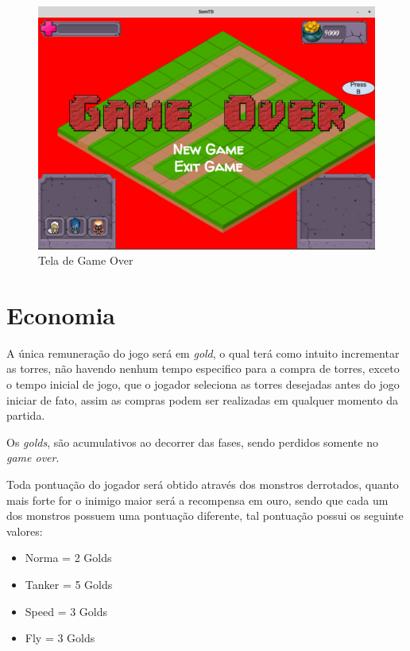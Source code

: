 \documentclass[11pt]{article} %
\begin{document}
\begin{figure}[!htp]
\centering
\includegraphics[scale=0.3]{res/game_over.png}
\caption{Tela de Game Over}
\label{Game Over}
\end{figure}
\newpage

\section{Economia}

A única remuneração do jogo será em \textit{gold}, o qual terá como intuito incrementar as torres, não havendo nenhum tempo especifico para a compra de torres, exceto o tempo inicial de jogo, que o jogador seleciona as torres desejadas antes do jogo iniciar de fato, assim as compras podem ser realizadas em qualquer momento da partida.

Os \textit{golds}, são acumulativos ao decorrer das fases, sendo perdidos somente no \textit{game over}.

Toda pontuação do jogador será obtido através dos monstros derrotados, quanto mais forte for o inimigo  maior será a recompensa em ouro, sendo que cada um dos monstros possuem uma pontuação diferente, tal pontuação possui os seguinte valores:

\begin{itemize}
 \item Norma = 2 Golds
 \item Tanker = 5 Golds
 \item Speed = 3 Golds
 \item Fly = 3 Golds
 \end{itemize} 
 
\end{document}
